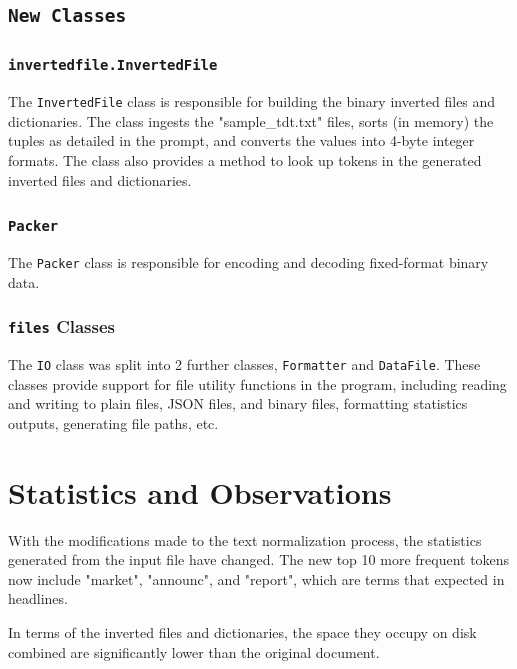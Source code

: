 \documentclass[11pt]{article}
\begin{document}
\subsection{\texttt{New Classes}}

\subsubsection{\texttt{invertedfile.InvertedFile}}
The \texttt{InvertedFile} class is responsible for building the binary inverted files and dictionaries. The class ingests the "sample\_tdt.txt" files, sorts (in memory) the tuples as detailed in the prompt, and converts the values into 4-byte integer formats. The class also provides a method to look up tokens in the generated inverted files and dictionaries.

\subsubsection{\texttt{Packer}}
The \texttt{Packer} class is responsible for encoding and decoding fixed-format binary data.

\subsubsection{\texttt{files} Classes}
The \texttt{IO} class was split into 2 further classes, \texttt{Formatter} and \texttt{DataFile}. These classes provide support for file utility functions in the program, including reading and writing to plain files, JSON files, and binary files, formatting statistics outputs, generating file paths, etc.

\section{Statistics and Observations}
With the modifications made to the text normalization process, the statistics generated from the input file have changed. The new top 10 more frequent tokens now include "market", "announc", and "report", which are terms that expected in headlines.

In terms of the inverted files and dictionaries, the space they occupy on disk combined are significantly lower than the original document.
\end{document}
